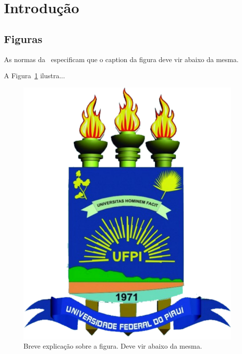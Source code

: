 
\chapter*[Introdução]{Introdução}



\section*{Figuras}\label{sec:figuras}

As normas da~ especificam que o caption da figura deve vir abaixo da mesma.

A Figura~\ref{fig:log} ilustra...

\begin{figure}[htpb]
   \centering
   \includegraphics[scale=.3]{figs/logo}
   \caption{Breve explicação sobre a figura. Deve vir abaixo da mesma.}
   \label{fig:log}
\end{figure}

